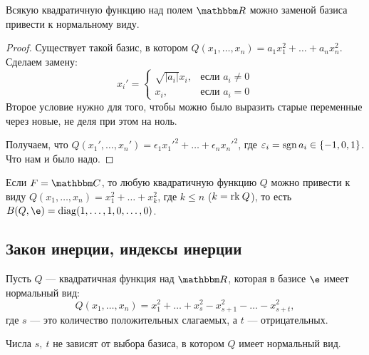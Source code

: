 \begin{Consequence}
Всякую квадратичную функцию над полем $\R$ можно заменой базиса привести к нормальному виду.
\end{Consequence}

\begin{proof}
Существует такой базис, в котором $Q(x_1, \ldots, x_n) = a_1x_1^2 + \ldots + a_nx_n^2$. Сделаем замену:
$$
x_i' = 
\begin{cases}
\sqrt{|a_i|}x_i, & \text{если } a_i \neq 0 \\
x_i, & \text{если } a_i = 0
\end{cases}
$$
Второе условие нужно для того, чтобы можно было выразить старые переменные через новые, не деля при этом на ноль.

Получаем, что $Q(x_1', \ldots, x_n') = \epsilon_1x_1'^2 + \ldots + \epsilon_nx_n'^2$, где $\varepsilon_i = \operatorname{\mathop{sgn}} a_i \in \{-1, 0, 1\}$. Что нам и было надо.
\end{proof}

\begin{Comment}
Если $F = \C$, то любую квадратичную функцию $Q$ можно привести к виду $Q(x_1, \ldots, x_n) = x_1^2 + \ldots + x_k^2$, где $k \leqslant n$ ($k = \mathrm{rk}\: Q$), то есть $B(Q, \e) = \diag(1, \ldots, 1, 0, \ldots, 0)$.
\end{Comment}

\subsection*{Закон инерции, индексы инерции}

Пусть $Q$ --- квадратичная функция над $\R$, которая в базисе $\e$ имеет нормальный вид: 
$$
Q(x_1, \ldots, x_n) = x_1^2 + \ldots + x_s^2 - x_{s + 1}^2 - \ldots - x_{s + t}^2,
$$
где $s$ --- это количество положительных слагаемых, а $t$ --- отрицательных.

\begin{Theorem}
Числа $s,\ t$ не зависят от выбора базиса, в котором $Q$ имеет нормальный вид.
\end{Theorem}

